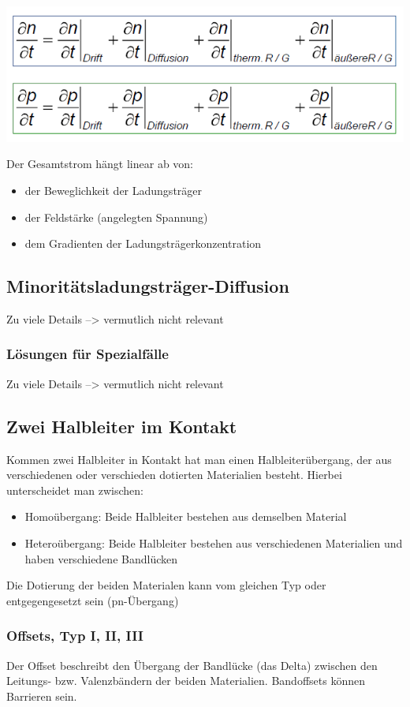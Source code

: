 \begin{center}
	\includegraphics[width=0.7\linewidth]{Kapitel/Kap05/Kontinuitaetsgleichung}
\end{center}

Der Gesamtstrom hängt linear ab von:
\begin{itemize}
	\item der Beweglichkeit der Ladungsträger
	\item der Feldstärke (angelegten Spannung)
	\item dem Gradienten der Ladungsträgerkonzentration
\end{itemize}

\subsection{Minoritätsladungsträger-Diffusion}
	Zu viele Details --> vermutlich nicht relevant
	
	\subsubsection{Lösungen für Spezialfälle}
	Zu viele Details --> vermutlich nicht relevant
	
	
\subsection{Zwei Halbleiter im Kontakt}
	Kommen zwei Halbleiter in Kontakt hat man einen Halbleiterübergang, der aus verschiedenen oder verschieden dotierten Materialien besteht.
	Hierbei unterscheidet man zwischen:

	\begin{itemize}
		\item Homoübergang: Beide Halbleiter bestehen aus demselben Material 
		\item Heteroübergang: Beide Halbleiter bestehen aus verschiedenen Materialien und haben verschiedene Bandlücken		
	\end{itemize}
	Die Dotierung der beiden Materialen kann vom gleichen Typ oder entgegengesetzt sein (pn-Übergang)
	\subsubsection{Offsets, Typ I, II, III}
	Der Offset beschreibt den Übergang der Bandlücke (das Delta) zwischen den Leitungs- bzw. Valenzbändern der beiden Materialien. Bandoffsets können Barrieren sein.
	
